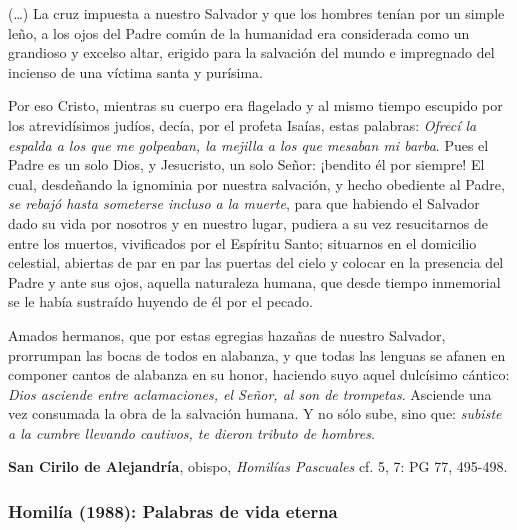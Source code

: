 \label{b2-04-01-1985H}

\begin{patercite}
	(\ldots) La cruz impuesta a nuestro Salvador y que los hombres tenían por un simple leño, a los ojos del Padre común de la humanidad era considerada como un grandioso y excelso altar, erigido para la salvación del mundo e impregnado del incienso de una víctima santa y purísima.
	
	Por eso Cristo, mientras su cuerpo era flagelado y al mismo tiempo	escupido por los atrevidísimos judíos, decía, por el profeta Isaías,	estas palabras: \textit{Ofrecí la espalda a los que me golpeaban, la mejilla a	los que mesaban mi barba}. Pues el Padre es un solo Dios, y Jesucristo,	un solo Señor: ¡bendito él por siempre! El cual, desdeñando la ignominia	por nuestra salvación, y hecho obediente al Padre, \textit{se rebajó hasta	someterse incluso a la muerte}, para que habiendo el Salvador dado su	vida por nosotros y en nuestro lugar, pudiera a su vez resucitarnos de	entre los muertos, vivificados por el Espíritu Santo; situarnos en el	domicilio celestial, abiertas de par en par las puertas del cielo y	colocar en la presencia del Padre y ante sus ojos, aquella naturaleza	humana, que desde tiempo inmemorial se le había sustraído huyendo de él	por el pecado.
	
	Amados hermanos, que por estas egregias hazañas de nuestro Salvador,	prorrumpan las bocas de todos en alabanza, y que todas las lenguas se	afanen en componer cantos de alabanza en su honor, haciendo suyo aquel	dulcísimo cántico: \textit{Dios asciende entre aclamaciones, el Señor, al son	de trompetas}. Asciende una vez consumada la obra de la salvación	humana. Y no sólo sube, sino que: \textit{subiste a la cumbre llevando	cautivos, te dieron tributo de hombres}.
	
	\textbf{San Cirilo de Alejandría}, obispo, \textit{Homilías Pascuales} cf. 5, 7: PG 77, 495-498.
\end{patercite}

\newpage

\subsubsection{Homilía (1988): Palabras de vida eterna}


